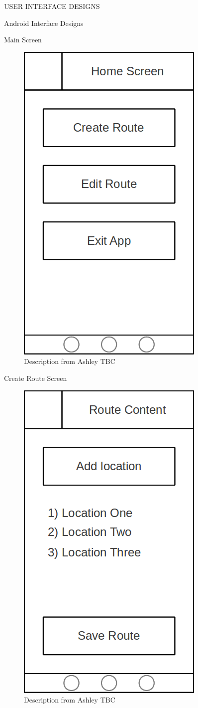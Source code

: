 \documentclass{article}
\begin{document}
	\clearpage
	\begin{section}{USER INTERFACE DESIGNS}
		\begin{subsection}{Android Interface Designs}
			\begin{subsubsection}{Main Screen}
				\begin{figure}[h!]
					\begin{center}
						\includegraphics[height=0.45\columnwidth]{../Diagrams/AndroidUserInterface/source/homeScreen.png}
					\end{center}
					\caption{Description from Ashley TBC}
				\end{figure}
			\end{subsubsection}
			
			\begin{subsubsection}{Create Route Screen}
				\begin{figure}[h!]
					\begin{center}
						\includegraphics[height=0.45\columnwidth]{../Diagrams/AndroidUserInterface/source/routeContent.png}
					\end{center}
					\caption{Description from Ashley TBC}
				\end{figure}
			\end{subsubsection}
			

\end{subsection}
\end{section}
\end{document}
